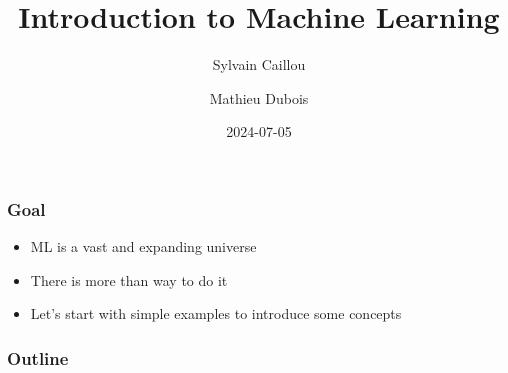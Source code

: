 \documentclass[10pt]{beamer}
\title{Introduction to Machine Learning}
\author{Sylvain Caillou \and Mathieu Dubois}
\institute{L2IT}
\date{2024-07-05}
\begin{document}
\frame{\titlepage}

\begin{frame}
  \frametitle{Goal}
  \begin{itemize}
  \item \ac{ML} is a vast and expanding universe
  \item There is more than way to do it
  \item Let's start with simple examples to introduce some concepts
  \end{itemize}
\end{frame}

\begin{frame}
  \frametitle{Outline}
  \tableofcontents
\end{frame}






\end{document}
